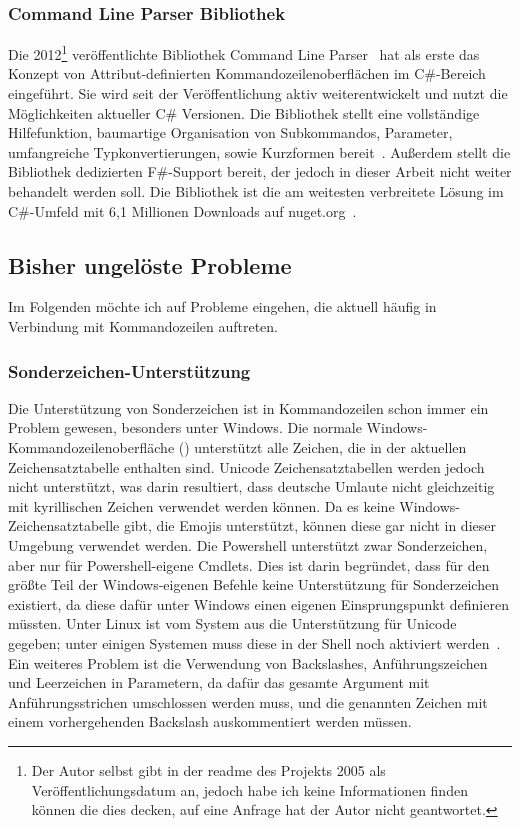 \subsubsection{Command Line Parser Bibliothek}
Die 2012\footnote{Der Autor selbst gibt in der readme des Projekts 2005 als Veröffentlichungsdatum an, jedoch habe ich keine Informationen finden können die dies decken, auf eine Anfrage hat der Autor nicht geantwortet.} veröffentlichte Bibliothek Command Line Parser~\cite{FirstCommandLineParserCommit}
hat als erste das Konzept von Attribut-definierten Kommandozeilenoberflächen im C\#-Bereich eingeführt.
Sie wird seit der Veröffentlichung aktiv weiterentwickelt und nutzt die Möglichkeiten aktueller C\# Versionen.
Die Bibliothek stellt eine vollständige Hilfefunktion, baumartige Organisation von Subkommandos, Parameter, umfangreiche Typkonvertierungen, sowie Kurzformen bereit~\cite{CommandLineParserWiki}.
Au\ss erdem stellt die Bibliothek dedizierten F\#-Support bereit, der jedoch in dieser Arbeit nicht weiter behandelt werden soll.
Die Bibliothek ist die am weitesten verbreitete Lösung im C\#-Umfeld mit 6,1 Millionen Downloads auf nuget.org~\cite{CommandLineParserNuget}.
\subsection{Bisher ungelöste Probleme}\label{subsec:currentproblems}
Im Folgenden möchte ich auf Probleme eingehen, die aktuell häufig in Verbindung mit
Kommandozeilen auftreten.
\subsubsection{Sonderzeichen-Unterstützung}\label{Sonderzeichen}
Die Unterstützung von Sonderzeichen ist in Kommandozeilen schon immer ein Problem gewesen,
besonders unter Windows.
Die normale Windows-Kommandozeilenoberfläche ()
unterstützt alle Zeichen, die in der aktuellen Zeichensatztabelle enthalten sind.
Unicode Zeichensatztabellen werden jedoch nicht unterstützt, was darin resultiert, dass deutsche Umlaute
nicht gleichzeitig mit kyrillischen Zeichen verwendet werden können.
Da es keine Windows-Zeichensatztabelle gibt, die Emojis unterstützt, können diese gar nicht in dieser Umgebung
verwendet werden.
Die Powershell unterstützt zwar Sonderzeichen, aber nur für Powershell-eigene Cmdlets.
Dies ist darin begründet, dass für den gr\"o\ss te Teil der Windows-eigenen Befehle keine Unterst\"utzung f\"ur Sonderzeichen existiert,
da diese dafür unter Windows einen eigenen Einsprungspunkt definieren müssten.
Unter Linux ist vom System aus die Unterstützung für Unicode gegeben;
unter einigen Systemen muss diese in der Shell noch aktiviert werden~\cite{LinuxUnicode}.
Ein weiteres Problem ist die Verwendung von Backslashes, Anführungszeichen und Leerzeichen in Parametern, da dafür das gesamte Argument mit Anführungsstrichen umschlossen werden muss, und die genannten Zeichen mit einem vorhergehenden Backslash auskommentiert werden müssen.
